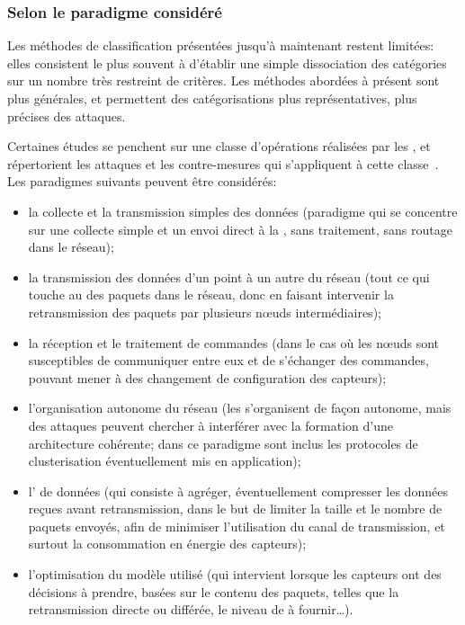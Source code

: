     \subsubsection{Selon le paradigme considéré}\label{ea:sss:paradigm}
Les méthodes de classification présentées jusqu'à maintenant restent limitées: elles consistent le plus souvent à d'établir une simple dissociation des catégories sur un nombre très restreint de critères.
Les méthodes abordées à présent sont plus générales, et permettent des catégorisations plus représentatives, plus précises des attaques.

Certaines études se penchent sur une classe d'opérations réalisées par les \rcs, et répertorient les attaques et les contre-mesures qui s'appliquent à cette classe~\cite{JPD06,OX09}.
Les paradigmes suivants peuvent être considérés:
\begin{itemize}
    \item la collecte et la transmission simples des données (paradigme qui se concentre sur une collecte simple et un envoi direct à la \sdb, sans traitement, sans routage dans le réseau);
    \item la transmission des données d'un point à un autre du réseau (\cad tout ce qui touche au  des paquets dans le réseau, donc en faisant intervenir la retransmission des paquets par plusieurs nœuds intermédiaires);
    \item la réception et le traitement de commandes (dans le cas où les nœuds sont susceptibles de communiquer entre eux et de s'échanger des commandes, pouvant mener à des changement de configuration des capteurs);
    \item l'organisation autonome du réseau (les \rcs s'organisent de façon autonome, mais des attaques peuvent chercher à interférer avec la formation d'une architecture cohérente; dans ce paradigme sont inclus les protocoles de clusterisation éventuellement mis en application);
    \item l' de données (qui consiste à agréger, éventuellement compresser les données reçues avant retransmission, dans le but de limiter la taille et le nombre de paquets envoyés, afin de minimiser l'utilisation du canal de transmission, et surtout la consommation en énergie des capteurs);
    \item l'optimisation du modèle utilisé (qui intervient lorsque les capteurs ont des décisions à prendre, basées sur le contenu des paquets, telles que la retransmission directe ou différée, le niveau de \secu à fournir\dots).
\end{itemize}

